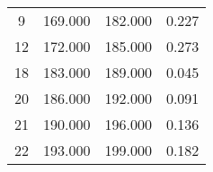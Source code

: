 % 
\begin{tabular}{cccc}
  \hline
  \hline
9 & 169.000 & 182.000 & 0.227 \\ 
  12 & 172.000 & 185.000 & 0.273 \\ 
  18 & 183.000 & 189.000 & 0.045 \\ 
  20 & 186.000 & 192.000 & 0.091 \\ 
  21 & 190.000 & 196.000 & 0.136 \\ 
  22 & 193.000 & 199.000 & 0.182 \\ 
   \hline
\end{tabular}
